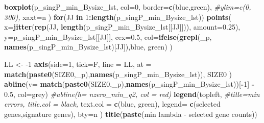 \documentclass[
]{book}
\newenvironment{Shaded}{\begin{snugshade}}{\end{snugshade}}
\newcommand{\CommentTok}[1]{\textcolor[rgb]{0.56,0.35,0.01}{\textit{#1}}}
\newcommand{\ControlFlowTok}[1]{\textcolor[rgb]{0.13,0.29,0.53}{\textbf{#1}}}
\newcommand{\DataTypeTok}[1]{\textcolor[rgb]{0.13,0.29,0.53}{#1}}
\newcommand{\DecValTok}[1]{\textcolor[rgb]{0.00,0.00,0.81}{#1}}
\newcommand{\FloatTok}[1]{\textcolor[rgb]{0.00,0.00,0.81}{#1}}
\newcommand{\KeywordTok}[1]{\textcolor[rgb]{0.13,0.29,0.53}{\textbf{#1}}}
\newcommand{\NormalTok}[1]{#1}
\newcommand{\OperatorTok}[1]{\textcolor[rgb]{0.81,0.36,0.00}{\textbf{#1}}}
\newcommand{\StringTok}[1]{\textcolor[rgb]{0.31,0.60,0.02}{#1}}
\begin{document}
\begin{Shaded}
\begin{Highlighting}[]
\KeywordTok{boxplot}\NormalTok{(p\_singP\_min\_Bysize\_lst,}
  \DataTypeTok{col=}\DecValTok{0}\NormalTok{,}
  \DataTypeTok{border=}\KeywordTok{c}\NormalTok{(}\StringTok{\textquotesingle{}blue\textquotesingle{}}\NormalTok{,}\StringTok{\textquotesingle{}green\textquotesingle{}}\NormalTok{),}
  \CommentTok{\#ylim=c(0, 300),}
  \DataTypeTok{xaxt=}\StringTok{\textquotesingle{}n\textquotesingle{}}
\NormalTok{)}
\ControlFlowTok{for}\NormalTok{(JJ }\ControlFlowTok{in} \DecValTok{1}\OperatorTok{:}\KeywordTok{length}\NormalTok{(p\_singP\_min\_Bysize\_lst))}
\KeywordTok{points}\NormalTok{(}
   \DataTypeTok{x=}\KeywordTok{jitter}\NormalTok{(}\KeywordTok{rep}\NormalTok{(JJ, }\KeywordTok{length}\NormalTok{(p\_singP\_min\_Bysize\_lst[[JJ]])), }\DataTypeTok{amount=}\FloatTok{0.25}\NormalTok{),}
   \DataTypeTok{y=}\NormalTok{p\_singP\_min\_Bysize\_lst[[JJ]], }\DataTypeTok{cex=}\FloatTok{0.5}\NormalTok{,}
   \DataTypeTok{col=}\KeywordTok{ifelse}\NormalTok{(}\KeywordTok{grepl}\NormalTok{(}\StringTok{\textquotesingle{}\_p\textquotesingle{}}\NormalTok{, }\KeywordTok{names}\NormalTok{(p\_singP\_min\_Bysize\_lst)[JJ]),}\StringTok{\textquotesingle{}blue\textquotesingle{}}\NormalTok{, }\StringTok{\textquotesingle{}green\textquotesingle{}}\NormalTok{)}
\NormalTok{)}

\NormalTok{LL <{-}}\StringTok{ }\DecValTok{{-}1}
\KeywordTok{axis}\NormalTok{(}\DataTypeTok{side=}\DecValTok{1}\NormalTok{, }\DataTypeTok{tick=}\NormalTok{F, }\DataTypeTok{line =}\NormalTok{ LL,}
  \DataTypeTok{at =} \KeywordTok{match}\NormalTok{(}\KeywordTok{paste0}\NormalTok{(SIZE0,}\StringTok{\textquotesingle{}\_p\textquotesingle{}}\NormalTok{),}\KeywordTok{names}\NormalTok{(p\_singP\_min\_Bysize\_lst)),}
\NormalTok{  SIZE0}
\NormalTok{ )}
\KeywordTok{abline}\NormalTok{(}\DataTypeTok{v=} \KeywordTok{match}\NormalTok{(}\KeywordTok{paste0}\NormalTok{(SIZE0,}\StringTok{\textquotesingle{}\_p\textquotesingle{}}\NormalTok{),}\KeywordTok{names}\NormalTok{(p\_singP\_min\_Bysize\_lst))[}\OperatorTok{{-}}\DecValTok{1}\NormalTok{] }\OperatorTok{{-}}\StringTok{ }\FloatTok{0.5}\NormalTok{, }\DataTypeTok{col=}\StringTok{\textquotesingle{}grey\textquotesingle{}}\NormalTok{)}
\CommentTok{\#abline(h= nzero\_min\_q2, col = \textquotesingle{}red\textquotesingle{})}
\KeywordTok{legend}\NormalTok{(}\StringTok{\textquotesingle{}topleft\textquotesingle{}}\NormalTok{,}
   \CommentTok{\#title=\textquotesingle{}min errors\textquotesingle{}, title.col = \textquotesingle{}black\textquotesingle{},}
   \DataTypeTok{text.col =} \KeywordTok{c}\NormalTok{(}\StringTok{\textquotesingle{}blue\textquotesingle{}}\NormalTok{, }\StringTok{\textquotesingle{}green\textquotesingle{}}\NormalTok{),}
   \DataTypeTok{legend=} \KeywordTok{c}\NormalTok{(}\StringTok{\textquotesingle{}selected genes\textquotesingle{}}\NormalTok{,}\StringTok{\textquotesingle{}signature genes\textquotesingle{}}\NormalTok{),}
   \DataTypeTok{bty=}\StringTok{\textquotesingle{}n\textquotesingle{}}
\NormalTok{ )}
\KeywordTok{title}\NormalTok{(}\KeywordTok{paste}\NormalTok{(}\StringTok{\textquotesingle{}min lambda {-} selected gene counts\textquotesingle{}}\NormalTok{))}


\end{Highlighting}
\end{Shaded}
\end{document}
